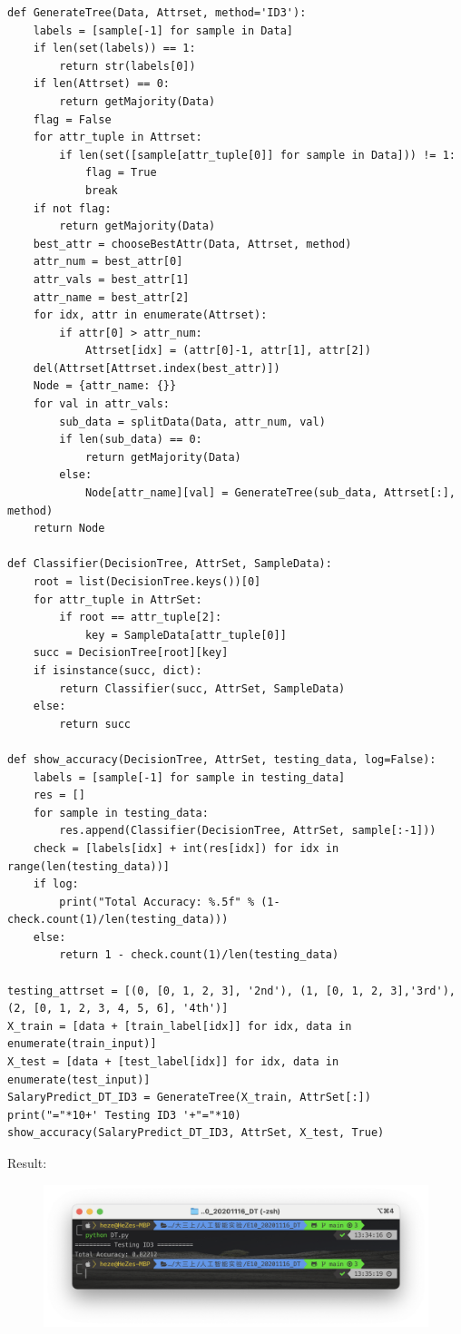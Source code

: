 \documentclass[a4paper, 11pt]{article}
\begin{document}
\begin{lstlisting}
def GenerateTree(Data, Attrset, method='ID3'):
    labels = [sample[-1] for sample in Data]
    if len(set(labels)) == 1:
        return str(labels[0])
    if len(Attrset) == 0:
        return getMajority(Data)
    flag = False
    for attr_tuple in Attrset:
        if len(set([sample[attr_tuple[0]] for sample in Data])) != 1:
            flag = True
            break
    if not flag:
        return getMajority(Data)
    best_attr = chooseBestAttr(Data, Attrset, method)
    attr_num = best_attr[0]
    attr_vals = best_attr[1]
    attr_name = best_attr[2]
    for idx, attr in enumerate(Attrset):
        if attr[0] > attr_num:
            Attrset[idx] = (attr[0]-1, attr[1], attr[2])
    del(Attrset[Attrset.index(best_attr)])
    Node = {attr_name: {}}
    for val in attr_vals:
        sub_data = splitData(Data, attr_num, val)
        if len(sub_data) == 0:
            return getMajority(Data)
        else:
            Node[attr_name][val] = GenerateTree(sub_data, Attrset[:], method)
    return Node

def Classifier(DecisionTree, AttrSet, SampleData):
    root = list(DecisionTree.keys())[0]
    for attr_tuple in AttrSet:
        if root == attr_tuple[2]:
            key = SampleData[attr_tuple[0]]
    succ = DecisionTree[root][key]
    if isinstance(succ, dict):
        return Classifier(succ, AttrSet, SampleData)
    else:
        return succ

def show_accuracy(DecisionTree, AttrSet, testing_data, log=False):
    labels = [sample[-1] for sample in testing_data]
    res = []
    for sample in testing_data:
        res.append(Classifier(DecisionTree, AttrSet, sample[:-1]))
    check = [labels[idx] + int(res[idx]) for idx in range(len(testing_data))]
    if log:
        print("Total Accuracy: %.5f" % (1-check.count(1)/len(testing_data)))
    else:
        return 1 - check.count(1)/len(testing_data)

testing_attrset = [(0, [0, 1, 2, 3], '2nd'), (1, [0, 1, 2, 3],'3rd'), (2, [0, 1, 2, 3, 4, 5, 6], '4th')]
X_train = [data + [train_label[idx]] for idx, data in enumerate(train_input)]
X_test = [data + [test_label[idx]] for idx, data in enumerate(test_input)]
SalaryPredict_DT_ID3 = GenerateTree(X_train, AttrSet[:])
print("="*10+' Testing ID3 '+"="*10)
show_accuracy(SalaryPredict_DT_ID3, AttrSet, X_test, True)
\end{lstlisting}

Result:
\begin{figure}[htb]
  \centering
  \includegraphics[width=1\textwidth]{1.png}
  \qquad
\end{figure}

%
%
\end{document}
